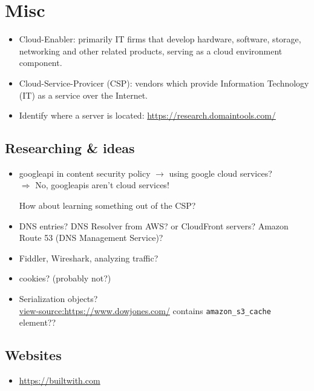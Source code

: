 \documentclass[12pt]{article}
\begin{document}
\newpage
\section*{Misc}
\begin{itemize}
    \item Cloud-Enabler: primarily IT firms that develop hardware, software, storage, networking and other related products, serving as a cloud environment component.
    \item Cloud-Service-Provicer (CSP): vendors which provide Information Technology (IT) as a service over the Internet.
    \item Identify where a server is located: \url{https://research.domaintools.com/}
\end{itemize}


\subsection*{Researching \& ideas}
\begin{itemize}
    \item googleapi in content security policy $\rightarrow$ using google cloud services? \\
    $\Rightarrow$ No, googleapis aren't cloud services!
    
    How about learning something out of the CSP?
    
    \item DNS entries? DNS Resolver from AWS? or CloudFront servers? Amazon Route 53 (DNS Management Service)?
    
    \item Fiddler, Wireshark, analyzing traffic?

    \item cookies? (probably not?)
    
    \item Serialization objects? \\
    \url{view-source:https://www.dowjones.com/} contains \verb|amazon_s3_cache| element??
\end{itemize}


\subsection*{Websites}
\begin{itemize}
    \item \url{https://builtwith.com}
\end{itemize}
\end{document}
